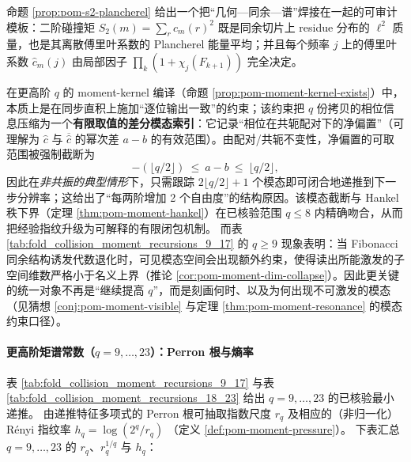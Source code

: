 \begin{remark}\label{rem:pom-closure-dim-mode-trunc}
命题 \ref{prop:pom-s2-plancherel} 给出一个把“几何—同余—谱”焊接在一起的可审计模板：二阶碰撞矩
\(
S_2(m)=\sum_r c_m(r)^2
\)
既是同余切片上 residue 分布的 \(\ell^2\) 质量，也是其离散傅里叶系数的 Plancherel 能量平均；并且每个频率 \(j\) 上的傅里叶系数 \(\widehat c_m(j)\) 由局部因子 \(\prod_k(1+\chi_j(F_{k+1}))\) 完全决定。

在更高阶 \(q\) 的 moment-kernel 编译（命题 \ref{prop:pom-moment-kernel-exists}）中，本质上是在同步直积上施加“逐位输出一致”的约束；该约束把 \(q\) 份拷贝的相位信息压缩为一个\textbf{有限取值的差分模态索引}：它记录“相位在共轭配对下的净偏置”（可理解为 \(\widehat c\) 与 \(\overline{\widehat c}\) 的幂次差 \(a-b\) 的有效范围）。由配对/共轭不变性，净偏置的可取范围被强制截断为
\[
-(\lfloor q/2\rfloor)\ \le\ a-b\ \le\ \lfloor q/2\rfloor,
\]
因此在\emph{非共振的典型情形}下，只需跟踪 \(2\lfloor q/2\rfloor+1\) 个模态即可闭合地递推到下一步分辨率；这给出了“每两阶增加 2 个自由度”的结构原因。该模态截断与 Hankel 秩下界（定理 \ref{thm:pom-moment-hankel}）在已核验范围 \(q\le 8\) 内精确吻合，从而把经验指纹升级为可解释的有限闭包机制。
而表 \ref{tab:fold_collision_moment_recursions_9_17} 的 \(q\ge 9\) 现象表明：当 Fibonacci 同余结构诱发代数退化时，可见模态空间会出现额外约束，使得读出所能激发的子空间维数严格小于名义上界（推论 \ref{cor:pom-moment-dim-collapse}）。因此更关键的统一对象不再是“继续提高 \(q\)”，而是刻画何时、以及为何出现不可激发的模态（见猜想 \ref{conj:pom-moment-visible} 与定理 \ref{thm:pom-moment-resonance} 的模态约束口径）。
\end{remark}







\paragraph{更高阶矩谱常数（\texorpdfstring{$q=9,\dots,23$}{q=9..23}）：Perron 根与熵率}
表 \ref{tab:fold_collision_moment_recursions_9_17} 与表 \ref{tab:fold_collision_moment_recursions_18_23} 给出 \(q=9,\dots,23\) 的已核验最小递推。
由递推特征多项式的 Perron 根可抽取指数尺度 \(r_q\) 及相应的（非归一化）Rényi 指纹率
\(
h_q=\log(2^q/r_q)
\)
（定义 \ref{def:pom-moment-pressure}）。
下表汇总 \(q=9,\dots,23\) 的 \(r_q\)、\(r_q^{1/q}\) 与 \(h_q\)：



